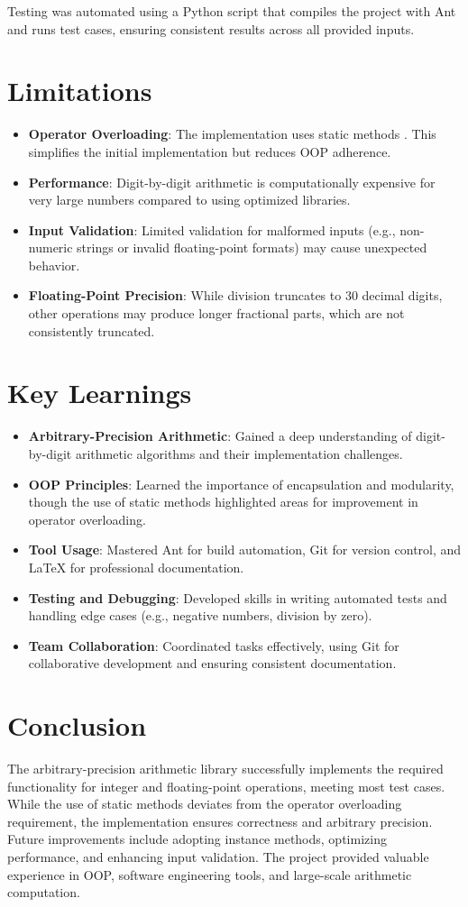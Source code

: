 \documentclass[12pt]{article}
\begin{document}
Testing was automated using a Python script that compiles the project with Ant and runs test cases, ensuring consistent results across all provided inputs.

\section{Limitations}
\begin{itemize}
    \item \textbf{Operator Overloading}: The implementation uses static methods . This simplifies the initial implementation but reduces OOP adherence.
    \item \textbf{Performance}: Digit-by-digit arithmetic is computationally expensive for very large numbers compared to using optimized libraries.
    \item \textbf{Input Validation}: Limited validation for malformed inputs (e.g., non-numeric strings or invalid floating-point formats) may cause unexpected behavior.
    \item \textbf{Floating-Point Precision}: While division truncates to 30 decimal digits, other operations may produce longer fractional parts, which are not consistently truncated.
\end{itemize}

\section{Key Learnings}
\begin{itemize}
    \item \textbf{Arbitrary-Precision Arithmetic}: Gained a deep understanding of digit-by-digit arithmetic algorithms and their implementation challenges.
    \item \textbf{OOP Principles}: Learned the importance of encapsulation and modularity, though the use of static methods highlighted areas for improvement in operator overloading.
    \item \textbf{Tool Usage}: Mastered Ant for build automation, Git for version control, and LaTeX for professional documentation.
    \item \textbf{Testing and Debugging}: Developed skills in writing automated tests and handling edge cases (e.g., negative numbers, division by zero).
    \item \textbf{Team Collaboration}: Coordinated tasks effectively, using Git for collaborative development and ensuring consistent documentation.
\end{itemize}

\section{Conclusion}
The arbitrary-precision arithmetic library successfully implements the required functionality for integer and floating-point operations, meeting most test cases. While the use of static methods deviates from the operator overloading requirement, the implementation ensures correctness and arbitrary precision. Future improvements include adopting instance methods, optimizing performance, and enhancing input validation. The project provided valuable experience in OOP, software engineering tools, and large-scale arithmetic computation.
\end{document}

